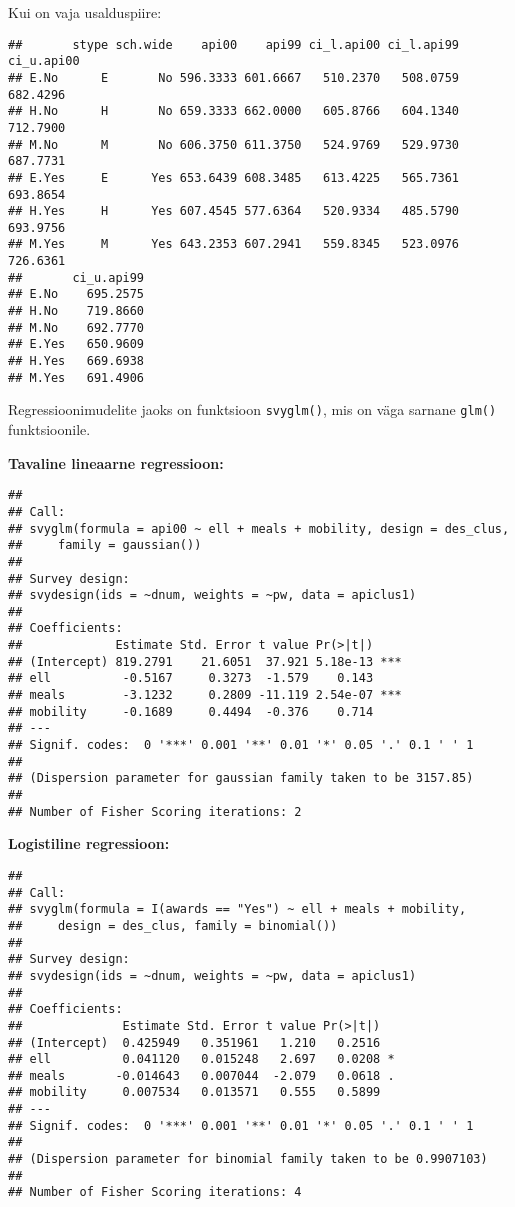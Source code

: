 \documentclass[
]{book}
\begin{document}
Kui on vaja usalduspiire:

\begin{verbatim}
##       stype sch.wide    api00    api99 ci_l.api00 ci_l.api99 ci_u.api00
## E.No      E       No 596.3333 601.6667   510.2370   508.0759   682.4296
## H.No      H       No 659.3333 662.0000   605.8766   604.1340   712.7900
## M.No      M       No 606.3750 611.3750   524.9769   529.9730   687.7731
## E.Yes     E      Yes 653.6439 608.3485   613.4225   565.7361   693.8654
## H.Yes     H      Yes 607.4545 577.6364   520.9334   485.5790   693.9756
## M.Yes     M      Yes 643.2353 607.2941   559.8345   523.0976   726.6361
##       ci_u.api99
## E.No    695.2575
## H.No    719.8660
## M.No    692.7770
## E.Yes   650.9609
## H.Yes   669.6938
## M.Yes   691.4906
\end{verbatim}

Regressioonimudelite jaoks on funktsioon \texttt{svyglm()}, mis on väga sarnane \texttt{glm()} funktsioonile.

\textbf{Tavaline lineaarne regressioon:}

\begin{verbatim}
## 
## Call:
## svyglm(formula = api00 ~ ell + meals + mobility, design = des_clus, 
##     family = gaussian())
## 
## Survey design:
## svydesign(ids = ~dnum, weights = ~pw, data = apiclus1)
## 
## Coefficients:
##             Estimate Std. Error t value Pr(>|t|)    
## (Intercept) 819.2791    21.6051  37.921 5.18e-13 ***
## ell          -0.5167     0.3273  -1.579    0.143    
## meals        -3.1232     0.2809 -11.119 2.54e-07 ***
## mobility     -0.1689     0.4494  -0.376    0.714    
## ---
## Signif. codes:  0 '***' 0.001 '**' 0.01 '*' 0.05 '.' 0.1 ' ' 1
## 
## (Dispersion parameter for gaussian family taken to be 3157.85)
## 
## Number of Fisher Scoring iterations: 2
\end{verbatim}

\textbf{Logistiline regressioon:}

\begin{verbatim}
## 
## Call:
## svyglm(formula = I(awards == "Yes") ~ ell + meals + mobility, 
##     design = des_clus, family = binomial())
## 
## Survey design:
## svydesign(ids = ~dnum, weights = ~pw, data = apiclus1)
## 
## Coefficients:
##              Estimate Std. Error t value Pr(>|t|)  
## (Intercept)  0.425949   0.351961   1.210   0.2516  
## ell          0.041120   0.015248   2.697   0.0208 *
## meals       -0.014643   0.007044  -2.079   0.0618 .
## mobility     0.007534   0.013571   0.555   0.5899  
## ---
## Signif. codes:  0 '***' 0.001 '**' 0.01 '*' 0.05 '.' 0.1 ' ' 1
## 
## (Dispersion parameter for binomial family taken to be 0.9907103)
## 
## Number of Fisher Scoring iterations: 4
\end{verbatim}
\end{document}
